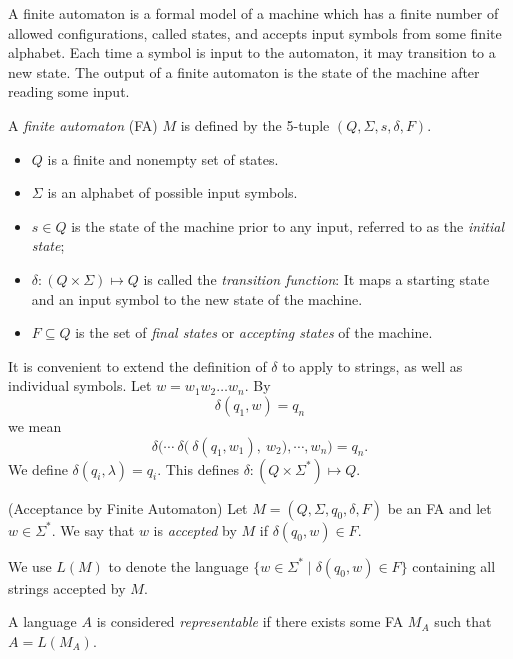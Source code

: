 \documentclass{bcthesis}
\newcommand{\footcite}[2]{\footnote{\cite[pg.~{#2}]{#1}}}
\renewcommand{\footcite}[2]{\cite[pg.~{#2}]{#1}}
\begin{document}

\label{ch:finite_automata}

	A finite automaton is a formal model of a machine which has a finite number of allowed configurations, called states, and accepts input symbols from some finite alphabet. 
	Each time a symbol is input to the automaton, it may transition to a new state. 
	The output of a finite automaton is the state of the machine after reading some input.

	\begin{definition}
		A \textit{finite automaton} (FA) $M$ is defined by the 5-tuple $(Q, \Sigma, s, \delta, F)$.
		\begin{itemize}
			\item [] $Q$ is a finite and nonempty set of states.
			\item [] $\Sigma$ is an alphabet of possible input symbols.
			\item [] $s \in Q$ is the state of the machine prior to any input, referred to as the \textit{initial state};
			\item [] $\delta: (Q \times \Sigma) \mapsto Q$ is called the \textit{transition function}: It maps a starting state and an input symbol to the new state of the machine.
			\item [] $F \subseteq Q$ is the set of \textit{final states} or \textit{accepting states} of the machine.
		\end{itemize}
		\footcite{hopcroft}{17}
	\end{definition}

	\begin{remark}
		It is convenient to extend the definition of $\delta$ to apply to strings, as well as individual symbols.
		Let $w = w_1 w_2 \dots w_n$.
		By 
		\[
			\delta(q_1, w) = q_n
		\] 
		we mean 
		\[
			\delta\bigg( \cdots \ \delta\Big( \ \delta(q_1, w_1), \ w_2 \Big), \cdots, w_n \bigg) = q_n.
		\]
		We define $\delta(q_i, \lambda) = q_i$.
		This defines $\delta: (Q \times \Sigma^*) \mapsto Q$.\footcite{hopcroft}{17}
	\end{remark}

	\begin{definition}(Acceptance by Finite Automaton)
		Let $M = (Q, \Sigma, q_0, \delta, F)$ be an FA and let $w \in \Sigma^*$.
		We say that $w$ is \textit{accepted} by $M$ if $\delta(q_0, w) \in F$.\footcite{hopcroft}{18}

		We use $L(M)$ to denote the language $\{ w \in \Sigma^* \mid \delta(q_0, w) \in F \}$ containing all strings accepted by $M$.\footcite{hopcroft}{18}

		A language $A$ is considered \textit{representable} if there exists some FA $M_A$ such that $A = L(M_A)$.\footcite{salomaa}{20}
	\end{definition}
\end{document}
